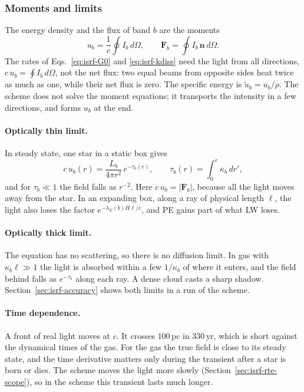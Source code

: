 \subsubsection{Moments and limits}
\label{sec:isrf-rte-limits}

The energy density and the flux of band $b$ are the moments
\begin{equation}
  u_b = \frac{1}{c}\oint I_b\,d\Omega, \qquad
  \boldsymbol{F}_b = \oint I_b\,\boldsymbol{n}\,d\Omega .
  \label{eq:isrf-moments}
\end{equation}
The rates of Eqs.~\eqref{eq:isrf-G0} and \eqref{eq:isrf-kdiss} need the light
from all directions, $c\,u_b=\oint I_b\,d\Omega$, not the net flux: two equal
beams from opposite sides heat twice as much as one, while their net flux is
zero. The specific energy is $\tilde u_b=u_b/\rho$. The scheme does not solve
the moment equations; it transports the intensity in a few directions, and
forms $u_b$ at the end.

\paragraph{Optically thin limit.} In steady state, one star in a static box
gives
\begin{equation}
  c\,u_b(r) = \frac{L_b}{4\pi r^2}\,e^{-\tau_b(r)},
  \qquad \tau_b(r)=\int_0^r\kappa_b\,dr',
  \label{eq:isrf-thin}
\end{equation}
and for $\tau_b\ll1$ the field falls as $r^{-2}$. Here $c\,u_b=|\boldsymbol{F}_b|$,
because all the light moves away from the star. In an expanding box, along a
ray of physical length $\ell$, the light also loses the factor
$e^{-\lambda_E(b)H\ell/c}$, and PE gains part of what LW loses.

\paragraph{Optically thick limit.} The equation has no scattering, so there is
no diffusion limit. In gas with $\kappa_b\ell\gg1$ the light is absorbed
within a few $1/\kappa_b$ of where it enters, and the field behind falls as
$e^{-\tau_b}$ along each ray. A dense cloud casts a sharp shadow.
Section~\ref{sec:isrf-accuracy} shows both limits in a run of the scheme.

\paragraph{Time dependence.} A front of real light moves at $c$. It crosses
$100$\,pc in $330$\,yr, which is short against the dynamical times of the
gas. For the gas the true field is close to its steady state, and the time
derivative matters only during the transient after a star is born or dies.
The scheme moves the light more slowly (Section~\ref{sec:isrf-rte-scope}), so
in the scheme this transient lasts much longer.

